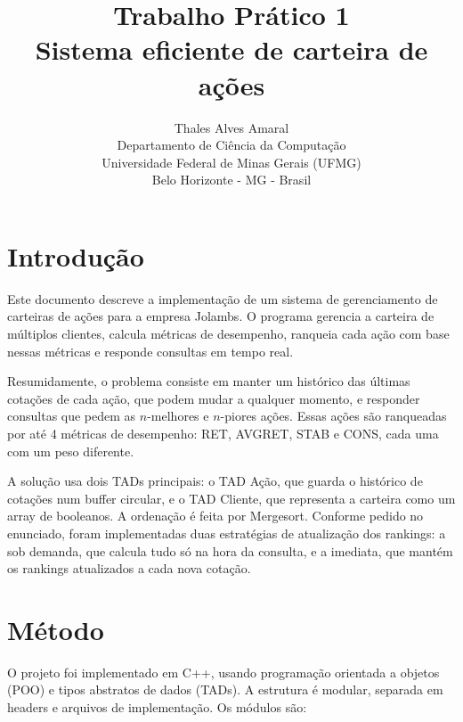 \documentclass[12pt,a4paper]{article}
\title{Trabalho Prático 1 \\ Sistema eficiente de carteira de ações}
\author{Thales Alves Amaral \\ \small{Departamento de Ciência da Computação} \\ \small{Universidade Federal de Minas Gerais (UFMG)} \\ \small{Belo Horizonte - MG - Brasil}}
\date{}
\begin{document}
\maketitle

\section{Introdução}
Este documento descreve a implementação de um sistema de gerenciamento de carteiras de ações para a empresa Jolambs. O programa gerencia a carteira de múltiplos clientes, calcula métricas de desempenho, ranqueia cada ação com base nessas métricas e responde consultas em tempo real.

Resumidamente, o problema consiste em manter um histórico das últimas cotações de cada ação, que podem mudar a qualquer momento, e responder consultas que pedem as $n$-melhores e $n$-piores ações. Essas ações são ranqueadas por até 4 métricas de desempenho: RET, AVGRET, STAB e CONS, cada uma com um peso diferente.

A solução usa dois TADs principais: o TAD Ação, que guarda o histórico de cotações num buffer circular, e o TAD Cliente, que representa a carteira como um array de booleanos. A ordenação é feita por Mergesort. Conforme pedido no enunciado, foram implementadas duas estratégias de atualização dos rankings: a sob demanda, que calcula tudo só na hora da consulta, e a imediata, que mantém os rankings atualizados a cada nova cotação.

\section{Método}
O projeto foi implementado em C++, usando programação orientada a objetos (POO) e tipos abstratos de dados (TADs). A estrutura é modular, separada em headers e arquivos de implementação. Os módulos são:
\end{document}
